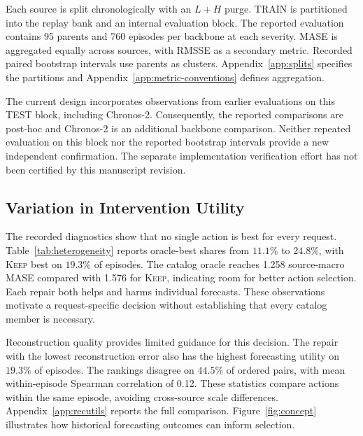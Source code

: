 \documentclass{article}
\begin{document}
Each source is split chronologically with an $L+H$ purge. TRAIN is partitioned into the
replay bank and an internal evaluation block. The reported evaluation contains 95 parents
and 760 episodes per backbone at each severity. MASE is aggregated equally across sources,
with RMSSE as a secondary metric. Recorded paired bootstrap intervals use parents as clusters.
Appendix~\ref{app:splits} specifies the partitions and Appendix~\ref{app:metric-conventions}
defines aggregation.

The current design incorporates observations from earlier evaluations on this TEST block,
including Chronos-2. Consequently, the reported comparisons are post-hoc and Chronos-2 is
an additional backbone comparison. Neither repeated evaluation on this block nor the reported
bootstrap intervals provide a new independent confirmation. The separate implementation
verification effort has not been certified by this manuscript revision.

\subsection{Variation in Intervention Utility}
\label{sec:exp-exists}
The recorded diagnostics show that no single action is best for every request.
Table~\ref{tab:heterogeneity} reports oracle-best shares from $11.1\%$ to $24.8\%$, with
\textsc{Keep} best on $19.3\%$ of episodes. The catalog oracle reaches 1.258 source-macro
MASE compared with 1.576 for \textsc{Keep}, indicating room for better action selection.
Each repair both helps and harms individual forecasts. These observations motivate a
request-specific decision without establishing that every catalog member is necessary.

Reconstruction quality provides limited guidance for this decision. The repair with the
lowest reconstruction error also has the highest forecasting utility on $19.3\%$ of episodes.
The rankings disagree on $44.5\%$ of ordered pairs, with mean within-episode Spearman
correlation of 0.12. These statistics compare actions within the same episode, avoiding
cross-source scale differences. Appendix~\ref{app:recutils} reports the full comparison.
Figure~\ref{fig:concept} illustrates how historical forecasting outcomes can inform selection.
\end{document}
